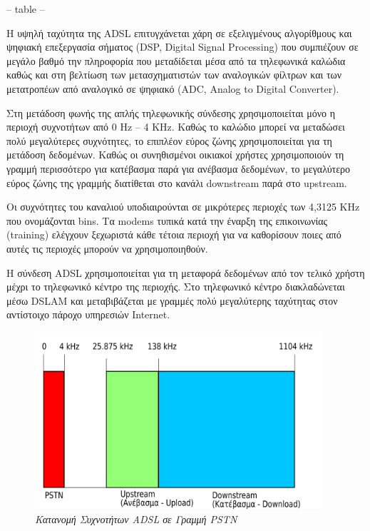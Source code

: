  -- table --
 
 Η υψηλή ταχύτητα της ADSL επιτυγχάνεται χάρη σε εξελιγμένους αλγορίθμους και ψηφιακή επεξεργασία σήματος (DSP, Digital Signal Processing) που συμπιέζουν σε μεγάλο βαθμό την πληροφορία που μεταδίδεται μέσα από τα τηλεφωνικά καλώδια καθώς και στη βελτίωση των μετασχηματιστών των αναλογικών φίλτρων και των μετατροπέων από αναλογικό σε ψηφιακό (ADC, Analog to Digital Converter).
 
 Στη μετάδοση φωνής της απλής τηλεφωνικής σύνδεσης χρησιμοποιείται μόνο η περιοχή συχνοτήτων από 0 Hz -- 4 KHz. Καθώς το καλώδιο μπορεί να μεταδώσει πολύ μεγαλύτερες συχνότητες, το επιπλέον εύρος ζώνης χρησιμοποιείται για τη μετάδοση δεδομένων. Καθώς οι συνηθισμένοι οικιακοί χρήστες χρησιμοποιούν τη γραμμή περισσότερο για κατέβασμα παρά για ανέβασμα δεδομένων, το μεγαλύτερο εύρος ζώνης της γραμμής διατίθεται στο κανάλι downstream παρά στο upstream.
 
 Οι συχνότητες του καναλιού υποδιαιρούνται σε μικρότερες περιοχές των 4,3125 KHz που ονομάζονται bins. Τα modems τυπικά κατά την έναρξη της επικοινωνίας (training) ελέγχουν ξεχωριστά κάθε τέτοια περιοχή για να καθορίσουν ποιες από αυτές τις περιοχές μπορούν να χρησιμοποιηθούν. 
 
 Η σύνδεση ADSL χρησιμοποιείται για τη μεταφορά δεδομένων από τον τελικό χρήστη μέχρι το τηλεφωνικό κέντρο της περιοχής. Στο τηλεφωνικό κέντρο διακλαδώνεται μέσω DSLAM και μεταβιβάζεται με γραμμές πολύ μεγαλύτερης ταχύτητας στον αντίστοιχο πάροχο υπηρεσιών Internet.
 
 \begin{figure}[!ht]
  \centering
  \includegraphics[width=0.95\textwidth]{images/chapter5/5-3}
  \caption {\textsl{Κατανομή Συχνοτήτων ADSL σε Γραμμή PSTN}}
  \label{5-3}
\end{figure}

